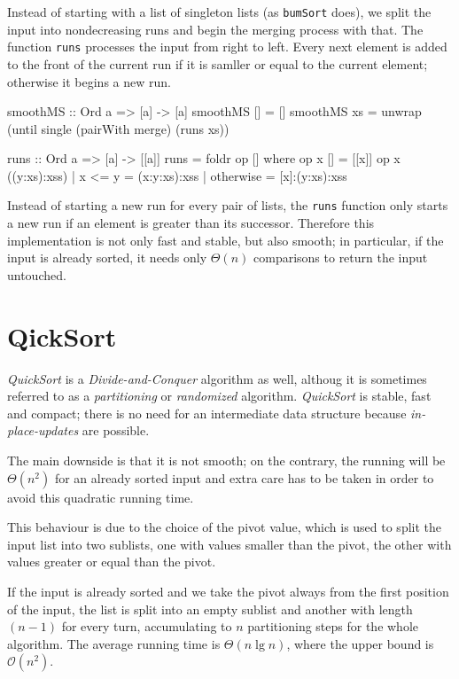 \begin{impl}
Instead of starting with a list of singleton lists (as \texttt{bumSort} does), we split the input into nondecreasing runs and begin the merging process with that.
The function \texttt{runs} processes the input from right to left.
Every next element is added to the front of the current run if it is samller or equal to the current element; otherwise it begins a new run.
\end{impl}

\begin{haskellcode}
  smoothMS :: Ord a => [a] -> [a]
  smoothMS [] = []
  smoothMS xs = unwrap (until single (pairWith merge) (runs xs))

  runs :: Ord a => [a] -> [[a]]
  runs = foldr op []
      where op x [] = [[x]]
            op x ((y:xs):xss) | x <= y = (x:y:xs):xss
                              | otherwise = [x]:(y:xs):xss
\end{haskellcode}

Instead of starting a new run for every pair of lists, the \texttt{runs} function only starts a new run if an element is greater than its successor.
Therefore this implementation is not only fast and stable, but also smooth; in particular, if the input is already sorted, it needs only $\Theta(n)$ comparisons to return the input untouched.

\section{QickSort}

\emph{QuickSort} is a \emph{Divide-and-Conquer} algorithm as well, althoug it is sometimes referred to as a \emph{partitioning} or \emph{randomized} algorithm.
\emph{QuickSort} is stable, fast and compact; there is no need for an intermediate data structure because \emph{in-place-updates} are possible.

The main downside is that it is not smooth; on the contrary, the running will be $\Theta (n^2)$ for an already sorted input and extra care has to be taken in order to avoid this quadratic running time.

This behaviour is due to the choice of the pivot value, which is used to split the input list into two sublists, one with values smaller than the pivot, the other with values greater or equal than the pivot.

If the input is already sorted and we take the pivot always from the first position of the input, the list is split into an empty sublist and another with length $(n-1)$ for every turn, accumulating to $n$ partitioning steps for the whole algorithm.
The average running time is $\Theta (n \lg n)$, where the upper bound is $\mathcal{O}(n^2)$.

